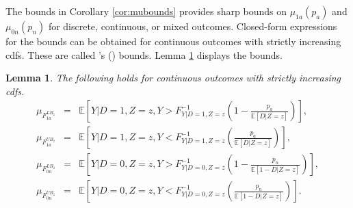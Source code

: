 \documentclass[12pt]{article}
\theoremstyle{plain}
\newtheorem{lemma}{Lemma}%
\theoremstyle{definition}
\theoremstyle{remark}
\begin{document}
The bounds in Corollary \ref{cor:mubounds} provides sharp bounds on $\mu_{1a}(p_a)$ and $\mu_{0n}(p_n)$ for discrete, continuous, or mixed outcomes. Closed-form expressions for the bounds can be obtained for continuous outcomes with strictly increasing cdfs. These are called \citeauthor{Lee2009TrainingEffects}'s (\citeyear{Lee2009TrainingEffects}) bounds. Lemma \ref{lem:lee2009} displays the bounds. 
\begin{lemma}\label{lem:lee2009}
    The following holds for continuous outcomes with strictly increasing cdfs.
    \begin{eqnarray*}
    \mu_{F_{1a}^{LB_z}} &=& \mathbb E\left[Y\vert D=1, Z=z, Y> F^{-1}_{Y\vert D=1, Z=z}\left(1-\frac{p_a}{\mathbb E[D\vert Z=z]}\right)\right],\\
\mu_{F_{1a}^{UB_z}} &=& \mathbb E\left[Y\vert D=1, Z=z, Y< F^{-1}_{Y\vert D=1, Z=z}\left(\frac{p_a}{\mathbb E[D\vert Z=z]}\right)\right],\\
\mu_{F_{0n}^{LB_z}} &=& \mathbb E\left[Y\vert D=0, Z=z, Y> F^{-1}_{Y\vert D=0, Z=z}\left(1-\frac{p_{n}}{\mathbb E[1-D\vert Z=z]}\right)\right],\\
\mu_{F_{0n}^{UB_z}} &=& \mathbb E\left[Y\vert D=0, Z=z, Y< F^{-1}_{Y\vert D=0, Z=z}\left(\frac{p_{n}}{\mathbb E[1-D\vert Z=z]}\right)\right].
\end{eqnarray*}
\end{lemma}


\end{document}
